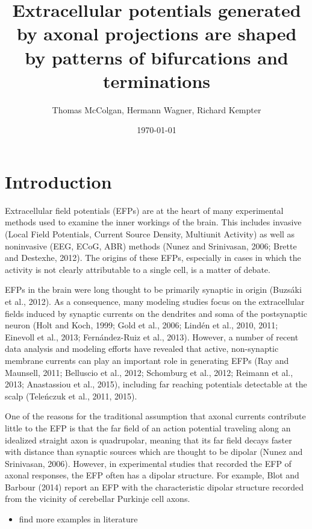 \documentclass[]{article}
\title{Extracellular potentials generated by axonal projections are shaped by
patterns of bifurcations and terminations}
\author{Thomas McColgan, Hermann Wagner, Richard Kempter}
\date{\today}
\providecommand{\tightlist}{%
  \setlength{\itemsep}{0pt}\setlength{\parskip}{0pt}}
\begin{document}
\maketitle

\section{Introduction}\label{introduction}

Extracellular field potentials (EFPs) are at the heart of many
experimental methods used to examine the inner workings of the brain.
This includes invasive (Local Field Potentials, Current Source Density,
Multiunit Activity) as well as noninvasive (EEG, ECoG, ABR) methods
(Nunez and Srinivasan, 2006; Brette and Destexhe, 2012). The origins of
these EFPs, especially in cases in which the activity is not clearly
attributable to a single cell, is a matter of debate.

EFPs in the brain were long thought to be primarily synaptic in origin
(Buzsáki et al., 2012). As a consequence, many modeling studies focus on
the extracellular fields induced by synaptic currents on the dendrites
and soma of the postsynaptic neuron (Holt and Koch, 1999; Gold et al.,
2006; Lindén et al., 2010, 2011; Einevoll et al., 2013; Fernández-Ruiz
et al., 2013). However, a number of recent data analysis and modeling
efforts have revealed that active, non-synaptic membrane currents can
play an important role in generating EFPs (Ray and Maunsell, 2011;
Belluscio et al., 2012; Schomburg et al., 2012; Reimann et al., 2013;
Anastassiou et al., 2015), including far reaching potentials detectable
at the scalp (Teleńczuk et al., 2011, 2015).

One of the reasons for the traditional assumption that axonal currents
contribute little to the EFP is that the far field of an action
potential traveling along an idealized straight axon is quadrupolar,
meaning that its far field decays faster with distance than synaptic
sources which are thought to be dipolar (Nunez and Srinivasan, 2006).
However, in experimental studies that recorded the EFP of axonal
responses, the EFP often has a dipolar structure. For example, Blot and
Barbour (2014) report an EFP with the characteristic dipolar structure
recorded from the vicinity of cerebellar Purkinje cell axons.

\begin{itemize}
\tightlist
\item
  find more examples in literature
\end{itemize}
\end{document}
